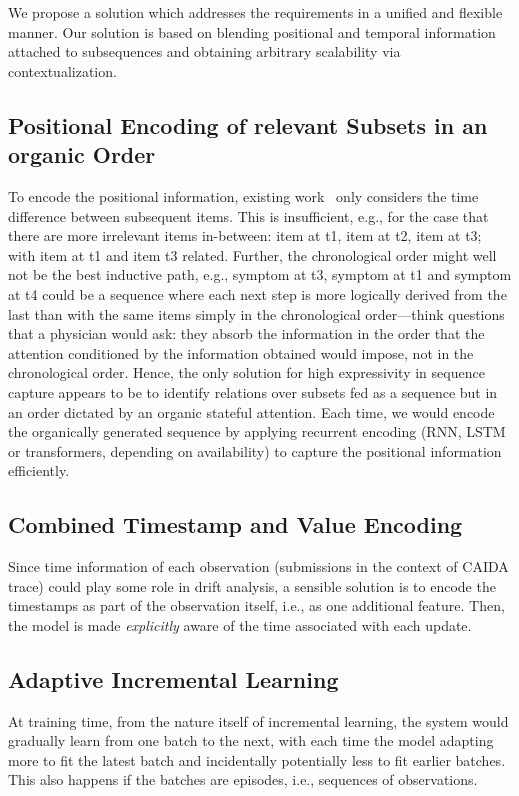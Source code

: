 We propose a solution which addresses the requirements in a unified and flexible manner.
Our solution is based on blending positional and temporal information attached to subsequences and obtaining arbitrary scalability via contextualization.

\subsection{Positional Encoding of relevant Subsets in an organic Order}
To encode the positional information, existing work~\cite{zhang2020time} only considers the time difference between subsequent items. This is insufficient, e.g., for the case that there are more irrelevant items in-between: item at t1, item at t2, item at t3; with item at t1 and item t3 related. Further, the chronological order might well not be the best inductive path, e.g., symptom at t3, symptom at t1 and symptom at t4 could be a sequence where each next step is more logically derived from the last than with the same items simply in the chronological order---think questions that a physician would ask: they absorb the information in the order that the attention conditioned by the information obtained would impose, not in the chronological order. Hence, the only solution for high expressivity in sequence capture appears to be to identify relations over subsets fed as a sequence but in an order dictated by an organic stateful attention. Each time, we would encode the organically generated sequence by applying recurrent encoding (RNN, LSTM or transformers, depending on availability) to capture the positional information efficiently.

\subsection{Combined Timestamp and Value Encoding} \label{sec:timestamp_encoding}
Since time information of each observation (submissions in the context of CAIDA trace) could play some role in drift analysis, a sensible solution is to encode the timestamps as part of the observation itself, i.e., as one additional feature. Then, the model is made \emph{explicitly} aware of the time associated with each update.

\subsection{Adaptive Incremental Learning} \label{sec:adaptive}
At training time, from the nature itself of incremental learning, the system would gradually learn from one batch to the next, with each time the model adapting more to fit the latest batch and incidentally potentially less to fit earlier batches. This also happens if the batches are episodes, i.e., sequences of observations.

